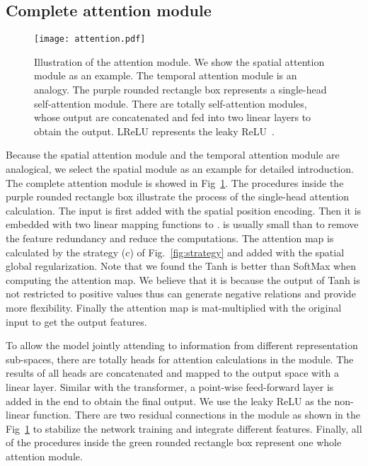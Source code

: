 \documentclass[runningheads]{llncs}
\begin{document}
\subsection{Complete attention module}
\label{sec:attention}

\begin{figure}[tp]
    \centering
    \texttt{[image: attention.pdf]}
    \caption{Illustration of the attention module. We show the spatial attention module as an example. The temporal attention module is an analogy. The purple rounded rectangle box represents a single-head self-attention module. There are totally  self-attention modules, whose output are concatenated and fed into two linear layers to obtain the output. LReLU represents the leaky ReLU~\cite{maas_rectifier_2013}.}
    \label{fig:attention}
\end{figure}{}

Because the spatial attention module and the temporal attention module are analogical, we select the spatial module as an example for detailed introduction. 
The complete attention module is showed in Fig~\ref{fig:attention}. 
The procedures inside the purple rounded rectangle box illustrate the process of the single-head attention calculation. 
The input  is first added with the spatial position encoding. 
Then it is embedded with two linear mapping functions to . 
 is usually small than  to remove the feature redundancy and reduce the computations.
The attention map is calculated by the strategy (c) of Fig.~\ref{fig:strategy} and added with the spatial global regularization. 
Note that we found the Tanh is better than SoftMax when computing the attention map. 
We believe that it is because the output of Tanh is not restricted to positive values thus can generate negative relations and provide more flexibility. 
Finally the attention map is mat-multiplied with the original input to get the output features. 

To allow the model jointly attending to information from different representation sub-spaces, there are totally  heads for attention calculations in the module. 
The results of all heads are concatenated and mapped to the output space  with a linear layer. 
Similar with the transformer, a point-wise feed-forward layer is added in the end to obtain the final output. 
We use the leaky ReLU as the non-linear function. 
There are two residual connections in the module as shown in the Fig~\ref{fig:attention} to stabilize the network training and integrate different features. 
Finally, all of the procedures inside the green rounded rectangle box represent one whole attention module. 
\end{document}
